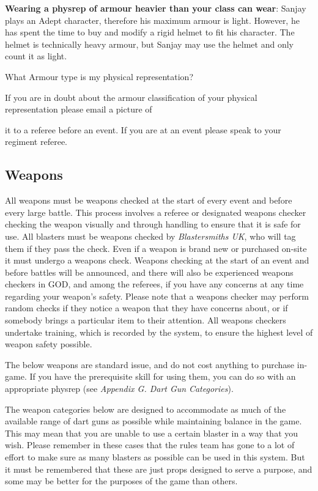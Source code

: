 \documentclass{scrbook}
\begin{document}
\textbf{Wearing a physrep of armour heavier than your class can wear}: Sanjay plays an Adept character, therefore his maximum armour is light. However, he has spent the time to buy and modify a rigid helmet to fit his character. The helmet is technically heavy armour, but Sanjay may use the helmet and only count it as light.

What Armour type is my physical representation?

If you are in doubt about the armour classification of your physical representation please email a picture of

it to a referee before an event. If you are at an event please speak to your regiment referee.

\subsection{Weapons}

All weapons must be weapons checked at the start of every event and before every large battle. This process involves a referee or designated weapons checker checking the weapon visually and through handling to ensure that it is safe for use. All blasters must be weapons checked by \textit{Blastersmiths UK}, who will tag them if they pass the check. Even if a weapon is brand new or purchased on-site it must undergo a weapons check. Weapons checking at the start of an event and before battles will be announced, and there will also be experienced weapons checkers in GOD, and among the referees, if you have any concerns at any time regarding your weapon's safety. Please note that a weapons checker may perform random checks if they notice a weapon that they have concerns about, or if somebody brings a particular item to their attention. All weapons checkers undertake training, which is recorded by the system, to ensure the highest level of weapon safety possible.

The below weapons are standard issue, and do not cost anything to purchase in-game. If you have the prerequisite skill for using them, you can do so with an appropriate physrep (see \textit{Appendix G. Dart Gun} \textit{Categories}).

The weapon categories below are designed to accommodate as much of the available range of dart guns as possible while maintaining balance in the game. This may mean that you are unable to use a certain blaster in a way that you wish. Please remember in these cases that the rules team has gone to a lot of effort to make sure as many blasters as possible can be used in this system. But it must be remembered that these are just props designed to serve a purpose, and some may be better for the purposes of the game than others.
\end{document}

